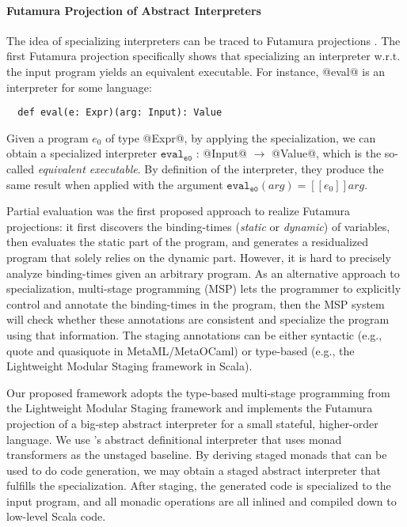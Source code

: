 \paragraph{Futamura Projection of Abstract Interpreters}

The idea of specializing interpreters can be traced to Futamura
projections \cite{Futamura1999, futamura1971partial}.
The first Futamura projection specifically shows that
specializing an interpreter w.r.t. the input program yields an
equivalent executable. For instance, @eval@ is an interpreter for
some language:
\begin{lstlisting}
  def eval(e: Expr)(arg: Input): Value
\end{lstlisting}
Given a program $e_0$ of type @Expr@, by applying the specialization,
we can obtain a specialized interpreter $\texttt{eval}_{\texttt{e0}}$ :
@Input@ $\to$ @Value@, which is the so-called \textit{equivalent executable}.
By definition of the interpreter, they produce the same result when applied
with the argument $\texttt{eval}_{\texttt{e0}}(arg) = [\![ e_0 ]\!] arg $.

Partial evaluation \cite{DBLP:books/daglib/0072559} was the first
proposed approach to realize Futamura projections: it first discovers
the binding-times (\textit{static} or \textit{dynamic}) of variables,
then evaluates the static part of the program, and generates a residualized
program that solely relies on the dynamic part. However, it is hard to
precisely analyze binding-times given an arbitrary program.
As an alternative approach to specialization, multi-stage programming (MSP)
\cite{taha1999multi, DBLP:conf/pepm/TahaS97}
lets the programmer to explicitly control and annotate the
binding-times in the program, then the MSP system will check whether these annotations
are consistent and specialize the program using that information.
The staging annotations can be either syntactic (e.g., quote and quasiquote
in MetaML/MetaOCaml) or type-based (e.g., the Lightweight Modular Staging
framework \cite{DBLP:conf/gpce/RompfO10} in Scala).

Our proposed framework adopts the type-based multi-stage programming from
the Lightweight Modular Staging framework and implements the Futamura
projection of a big-step abstract interpreter for a small stateful,
higher-order language.
We use \citet{DBLP:journals/pacmpl/DaraisLNH17}'s abstract definitional
interpreter that uses monad transformers as the unstaged baseline. By
deriving staged monads that can be used to do code generation, we may
obtain a staged abstract interpreter that fulfills the specialization.
After staging, the generated code is specialized to the input program,
and all monadic operations are all inlined and compiled down to low-level
Scala code.

